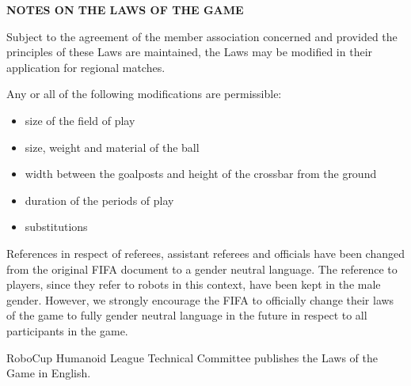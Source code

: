 \clearpage
\sffamily
{\bfseries\color[rgb]{0.4,0.4,0.4}
NOTES ON THE LAWS OF THE GAME }

\bigskip

{\color[rgb]{0.4,0.4,0.4}{Modifications} }

Subject to the agreement of the member association concerned and provided the principles of these Laws are maintained, the Laws may be modified in their application for regional matches.

Any or all of the following modifications are permissible: 

\begin{itemize}
\item size of the field of play
\item size, weight and material of the ball
\item width between the goalposts and height of the crossbar from the ground
\item duration of the periods of play
\item substitutions
\end{itemize}

\bigskip

{\color[rgb]{0.4,0.4,0.4}{Male and Female}}

References in respect of referees, assistant referees and officials have been changed from the original FIFA document to a gender neutral language. The reference to players, since they refer to robots in this context, have been kept in the male gender. However, we strongly encourage the FIFA to officially change their laws of the game to fully gender neutral language in the future in respect to all participants in the game.


\bigskip

{\color[rgb]{0.4,0.4,0.4}{Official languages}}

RoboCup Humanoid League Technical Committee publishes the Laws of the Game in English.

